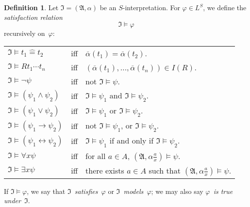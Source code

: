 \documentclass[letterpaper]{article}
\newcommand{\A}{\mathfrak{A}}
\newcommand{\I}{\mathfrak{I}}
\newcommand{\lequ}{\mathrel{\widehat{=}}}
\newcommand{\limp}{\rightarrow}
\newcommand{\liff}{\leftrightarrow}
\numberwithin{equation}{section}
\theoremstyle{plain}
\theoremstyle{definition}
\newtheorem{defn}[equation]{Definition}
\begin{document}
\begin{defn}
Let $\I=(\A,\alpha)$ be an $S$-interpretation. For $\varphi\in L^S$, we define the \emph{satisfaction relation}
$$\I\models\varphi$$
recursively on~$\varphi$:
\begin{center}
\begin{tabular}{lll}
$\I\models t_1\lequ t_2$&iff&$\overline{\alpha}(t_1)=\overline{\alpha}(t_2)$.\\
$\I\models Rt_1\cdots t_n$&iff&$(\overline{\alpha}(t_1),\ldots,\overline{\alpha}(t_n))\in I(R)$.\\
$\I\models\lnot\psi$&iff&not $\I\models\psi$.\\
$\I\models(\psi_1\land\psi_2)$&iff&$\I\models\psi_1$ and $\I\models\psi_2$.\\
$\I\models(\psi_1\lor\psi_2)$&iff&$\I\models\psi_1$ or $\I\models\psi_2$.\\
$\I\models(\psi_1\limp\psi_2)$&iff&not $\I\models\psi_1$, or $\I\models\psi_2$.\\
$\I\models(\psi_1\liff\psi_2)$&iff&$\I\models\psi_1$ if and only if $\I\models\psi_2$.\\
$\I\models\forall x\psi$&iff&for all $a\in A$, $(\A,\alpha\tfrac{a}{x})\models\psi$.\\
$\I\models\exists x\psi$&iff&there exists $a\in A$ such that $(\A,\alpha\tfrac{a}{x})\models\psi$.
\end{tabular}
\end{center}
If $\I\models\varphi$, we say that \emph{$\I$~satisfies~$\varphi$} or \emph{$\I$~models~$\varphi$}; we may also say \emph{$\varphi$~is true under~$\I$}.
\label{defn:satisfaction}
\end{defn}
\end{document}
